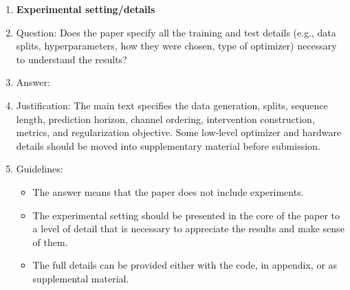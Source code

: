\begin{enumerate}
\item {\bf Experimental setting/details}
    \item[] Question: Does the paper specify all the training and test details (e.g., data splits, hyperparameters, how they were chosen, type of optimizer) necessary to understand the results?
    \item[] Answer: \answerYes{}
    \item[] Justification: The main text specifies the data generation, splits, sequence length, prediction horizon, channel ordering, intervention construction, metrics, and regularization objective. Some low-level optimizer and hardware details should be moved into supplementary material before submission.
    \item[] Guidelines:
    \begin{itemize}
        \item The answer \answerNA{} means that the paper does not include experiments.
        \item The experimental setting should be presented in the core of the paper to a level of detail that is necessary to appreciate the results and make sense of them.
        \item The full details can be provided either with the code, in appendix, or as supplemental material.
    \end{itemize}


\end{enumerate}
